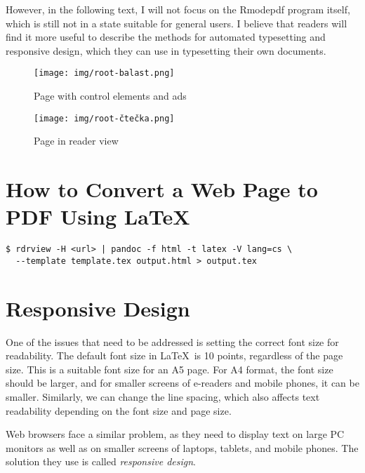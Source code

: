 \documentclass{ltugboat}
\newcommand\program[1]{#1}
\begin{document}
However, in the following text, I will not focus on the \program{Rmodepdf}
program itself, which is still not in a state suitable for general users. I
believe that readers will find it more useful to describe the methods for
automated typesetting and responsive design, which they can use in typesetting
their own documents.

\begin{figure*}[tbp]
  \centering
  \caption{Example of using the \emph{reader view} mode in the \program{Firefox} browser}
  \label{fig:readermode}
  \begin{subfigure}[t]{0.45\textwidth}
    \texttt{[image: img/root-balast.png]}
    \caption{Page with control elements and ads}
  \end{subfigure}
  \hfill
  \begin{subfigure}[t]{0.45\textwidth}
    \texttt{[image: img/root-čtečka.png]}
    \caption{Page in reader view}
  \end{subfigure}
\end{figure*}

\section{How to Convert a Web Page to PDF Using \LaTeX}


\begin{verbatim}
$ rdrview -H <url> | pandoc -f html -t latex -V lang=cs \
  --template template.tex output.html > output.tex
\end{verbatim}


\section{Responsive Design}

One of the issues that need to be addressed is setting the correct font size
for readability. The default font size in \LaTeX\ is 10 points, regardless of
the page size. This is a suitable font size for an A5 page. For A4 format, the
font size should be larger, and for smaller screens of e-readers and mobile
phones, it can be smaller. Similarly, we can change the line spacing, which
also affects text readability depending on the font size and page size.

Web browsers face a similar problem, as they need to display text on large PC
monitors as well as on smaller screens of laptops, tablets, and mobile phones.
The solution they use is called \textit{responsive design}.
\end{document}
